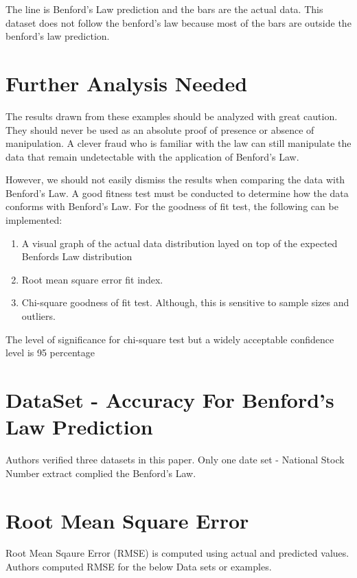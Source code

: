 The line is Benford’s Law prediction and the bars are 
the actual data. This dataset does not follow the benford's law
because most of the bars are outside the benford's law prediction.


\section{Further Analysis Needed}
The results drawn from these examples should 
be analyzed with great caution. They should 
never be used as an absolute proof of presence 
or absence of manipulation. A clever fraud who 
is familiar with the law can still manipulate 
the data that remain undetectable with the 
application of Benford’s Law.

However, we should not easily dismiss the results 
when comparing the data with Benford’s Law. 
A good fitness test must be conducted to determine 
how the data conforms with Benford’s Law.
For the goodness of fit test, the following can be implemented:

\begin{enumerate}
\item A visual graph of the actual data distribution 
layed on top of the expected Benfords Law distribution
\item Root mean square error fit index.
\item Chi-square goodness of fit test. Although, 
this is sensitive to sample sizes and outliers.
\end{enumerate}

The level of significance for chi-square test 
but a widely acceptable confidence level is 95 percentage

\section{DataSet - Accuracy For Benford's Law Prediction}
Authors verified three datasets in this paper. Only one
date set - National Stock Number extract 
complied the Benford's Law.

\section{Root Mean Square Error}
Root Mean Sqaure Error (RMSE) is computed 
using actual and predicted values.
Authors computed RMSE for the below Data sets or examples.

